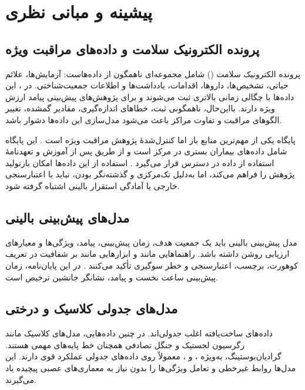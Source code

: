 \chapter{پیشینه و مبانی نظری}
\label{ch:background}

\section{پرونده الکترونیک سلامت و داده‌های مراقبت ویژه}
پرونده الکترونیک سلامت () شامل مجموعه‌ای ناهمگون از داده‌هاست: آزمایش‌ها، علائم حیاتی، تشخیص‌ها، داروها، اقدامات، یادداشت‌ها و اطلاعات جمعیت‌شناختی. در ، این داده‌ها با چگالی زمانی بالاتری ثبت می‌شوند و برای پژوهش‌های پیش‌بینی پیامد ارزش ویژه دارند. بااین‌حال، ناهمگونی ثبت، خطاهای اندازه‌گیری، مقادیر گمشده، تغییر الگوهای مراقبت و تفاوت مراکز باعث می‌شود مدل‌سازی این داده‌ها دشوار باشد.

پایگاه  یکی از مهم‌ترین منابع باز اما کنترل‌شدۀ پژوهش مراقبت ویژه است \cite{johnson2023mimic}. این پایگاه شامل داده‌های بیماران بستری در مرکز  است و از طریق  پس از آموزش و تعهدنامۀ استفاده از داده در دسترس قرار می‌گیرد \cite{goldberger2000physionet}. استفاده از این داده‌ها امکان بازتولید پژوهش را فراهم می‌کند، اما به‌دلیل تک‌مرکزی و گذشته‌نگر بودن، نباید با اعتبارسنجی خارجی یا آمادگی استقرار بالینی اشتباه گرفته شود.

\section{مدل‌های پیش‌بینی بالینی}
مدل پیش‌بینی بالینی باید یک جمعیت هدف، زمان پیش‌بینی، پیامد، ویژگی‌ها و معیارهای ارزیابی روشن داشته باشد. راهنماهایی مانند  و ابزارهایی مانند  بر شفافیت در تعریف کوهورت، برچسب، اعتبارسنجی و خطر سوگیری تأکید می‌کنند \cite{collins2015tripod,wolff2019probast}. در این پایان‌نامه، زمان پیش‌بینی  ساعت نخست  و پیامد، نشانگر جانشین ترخیص است.

\section{مدل‌های جدولی کلاسیک و درختی}
داده‌های ساخت‌یافته  اغلب جدولی‌اند. در چنین داده‌هایی، مدل‌های کلاسیک مانند رگرسیون لجستیک و جنگل تصادفی \cite{breiman2001random} همچنان خط پایه‌های مهمی هستند. گرادیان‌بوستینگ، به‌ویژه  \cite{chen2016xgboost}،  \cite{ke2017lightgbm} و  \cite{prokhorenkova2018catboost}، معمولاً روی داده‌های جدولی عملکرد قوی دارند. این مدل‌ها روابط غیرخطی و تعامل ویژگی‌ها را بدون نیاز به معماری‌های عصبی پیچیده یاد می‌گیرند.

